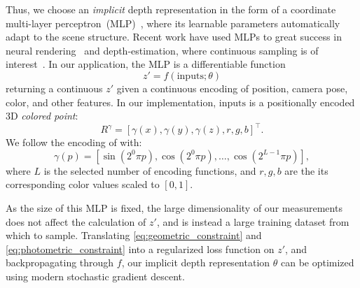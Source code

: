 Thus, we choose an \emph{implicit} depth representation in the form of a coordinate multi-layer perceptron~(MLP)~\cite{hornik1989multilayer}, where its learnable parameters automatically adapt to the scene structure.
Recent work have used MLPs to great success in neural rendering~\cite{mildenhall2020nerf,chen2021mvsnerf,park2021nerfies} and depth-estimation, where continuous sampling is of interest~\cite{zhang2021consistent}.
In our application, the MLP is a differentiable function
\begin{equation}
    z' = f(\mathrm{inputs}; \theta)
\end{equation}
returning a continuous $z'$ given a continuous encoding of position, camera pose, color, and other features. In our implementation, $\mathrm{inputs}$ is a positionally encoded 3D \emph{colored point}:
\begin{equation}
   R^\gamma=[\gamma(x), \gamma(y), \gamma(z), r, g, b]^\top.
\end{equation}
We follow the encoding of \cite{mildenhall2020nerf} with:
\begin{equation}\label{eq:positional_encoding}
    \gamma(p)=\left[\sin \left(2^{0} \pi p\right), \cos \left(2^{0} \pi p\right), \ldots ,\cos\left(2^{L-1} \pi p\right)\right],
\end{equation}
where $L$ is the selected number of encoding functions, and $r,g,b$ are the its corresponding color values scaled to $[0, 1]$. 

As the size of this MLP is fixed, the large dimensionality of our measurements does not affect the calculation of $z'$, and is instead a large training dataset from which to sample. Translating \eqref{eq:geometric_constraint} and \eqref{eq:photometric_constraint} into a regularized loss function on $z'$, and backpropagating through $f$, our implicit depth representation $\theta$ can be optimized using modern stochastic gradient descent. 

